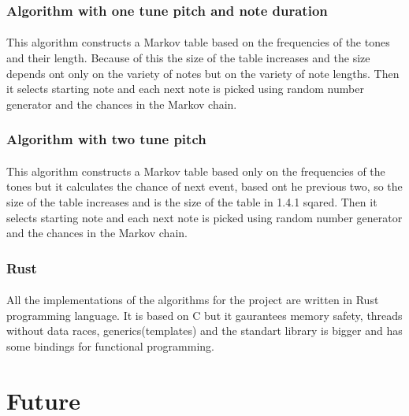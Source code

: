 \documentclass[]{article}
\begin{document}
            \subsubsection{Algorithm with one tune pitch and note duration}
            \paragraph{}This algorithm constructs a Markov table based on the frequencies of the tones and their length. Because of this the size of the table increases and the size depends ont only on the variety of notes but on the variety of note lengths. Then it selects starting note and each next note is picked using random number generator and the chances in the Markov chain.\paragraph{}
            \subsubsection{Algorithm with two tune pitch}
            \paragraph{}This algorithm constructs a Markov table based only on the frequencies of the tones but it calculates the chance of next event, based ont he previous two, so the size of the table increases and is the size of the table in 1.4.1 sqared. Then it selects starting note and each next note is picked using random number generator and the chances in the Markov chain.
            \subsubsection{Rust}
            \paragraph{}All the implementations of the algorithms for the project are written in Rust programming language. It is based on C but it gaurantees memory safety, threads without data races, generics(templates) and the standart library is bigger and has some bindings for functional programming.
        \newpage
    \section{Future}
\end{document}
